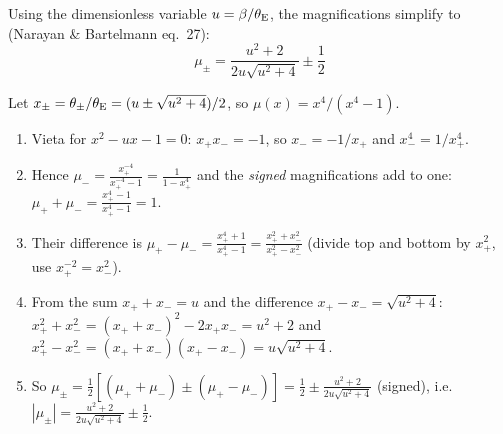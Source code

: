 Using the dimensionless variable $u = \beta/\theta_{\mathrm{E}}$, the magnifications
simplify to (Narayan \& Bartelmann eq.~27):
\begin{equation}
    \boxed{
    \mu_\pm = \frac{u^2 + 2}{2u\sqrt{u^2 + 4}} \pm \frac{1}{2}
    }
    \label{eq:magnification_u}
\end{equation}
\begin{derivation}
Let $x_\pm = \theta_\pm/\theta_{\mathrm{E}} = (u \pm \sqrt{u^2+4})/2$, so
$\mu(x) = x^4/(x^4 - 1)$.
\begin{enumerate}
    \item Vieta for $x^2 - ux - 1 = 0$: $x_+x_- = -1$, so $x_- = -1/x_+$ and
          $x_-^4 = 1/x_+^4$.
    \item Hence $\mu_- = \frac{x_+^{-4}}{x_+^{-4} - 1} = \frac{1}{1 - x_+^4}$
          and the \emph{signed} magnifications add to one:
          $\mu_+ + \mu_- = \frac{x_+^4 - 1}{x_+^4 - 1} = 1$.
    \item Their difference is
          $\mu_+ - \mu_- = \frac{x_+^4 + 1}{x_+^4 - 1}
          = \frac{x_+^2 + x_-^2}{x_+^2 - x_-^2}$
          (divide top and bottom by $x_+^2$, use $x_+^{-2} = x_-^2$).
    \item From the sum $x_+ + x_- = u$ and the difference
          $x_+ - x_- = \sqrt{u^2+4}$:
          $x_+^2 + x_-^2 = (x_+ + x_-)^2 - 2x_+x_- = u^2 + 2$ and
          $x_+^2 - x_-^2 = (x_+ + x_-)(x_+ - x_-) = u\sqrt{u^2+4}$.
    \item So $\mu_\pm = \tfrac12[(\mu_+ + \mu_-) \pm (\mu_+ - \mu_-)]
          = \tfrac12 \pm \frac{u^2+2}{2u\sqrt{u^2+4}}$ (signed), i.e.\
          $|\mu_\pm| = \frac{u^2+2}{2u\sqrt{u^2+4}} \pm \tfrac12$.
\end{enumerate}
\end{derivation}

